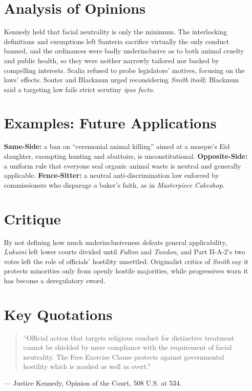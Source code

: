 \documentclass[12pt]{article}
\begin{document}
\section{Analysis of Opinions}
Kennedy held that facial neutrality is only the minimum. The interlocking definitions and exemptions left Santeria sacrifice virtually the only conduct banned, and the ordinances were badly underinclusive as to both animal cruelty and public health, so they were neither narrowly tailored nor backed by compelling interests. Scalia refused to probe legislators' motives, focusing on the laws' effects. Souter and Blackmun urged reconsidering \textit{Smith} itself; Blackmun said a targeting law fails strict scrutiny \textit{ipso facto}.

\section{Examples: Future Applications}
\textbf{Same-Side:} a ban on ``ceremonial animal killing'' aimed at a mosque's Eid slaughter, exempting hunting and abattoirs, is unconstitutional. \textbf{Opposite-Side:} a uniform rule that everyone seal organic animal waste is neutral and generally applicable. \textbf{Fence-Sitter:} a neutral anti-discrimination law enforced by commissioners who disparage a baker's faith, as in \textit{Masterpiece Cakeshop}.

\section{Critique}
By not defining how much underinclusiveness defeats general applicability, \textit{Lukumi} left lower courts divided until \textit{Fulton} and \textit{Tandon}, and Part II-A-2's two votes left the role of officials' hostility unsettled. Originalist critics of \textit{Smith} say it protects minorities only from openly hostile majorities, while progressives warn it has become a deregulatory sword.

\section{Key Quotations}
\begin{quote}
``Official action that targets religious conduct for distinctive treatment cannot be shielded by mere compliance with the requirement of facial neutrality. The Free Exercise Clause protects against governmental hostility which is masked as well as overt.''
\end{quote}
\noindent --- Justice Kennedy, Opinion of the Court, 508 U.S. at 534.
\end{document}
